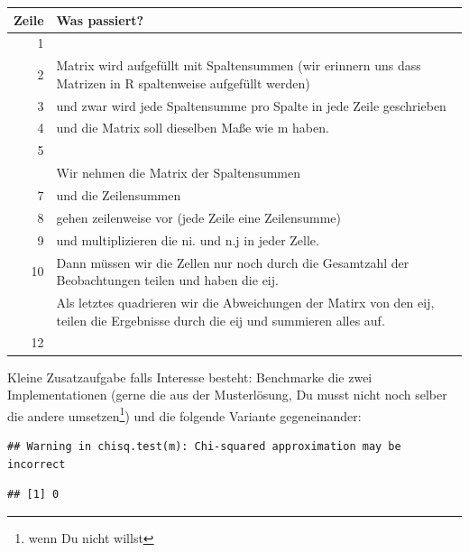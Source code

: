 \documentclass[
]{book}
\newenvironment{Shaded}{\begin{snugshade}}{\end{snugshade}}
\newcommand{\FunctionTok}[1]{\textcolor[rgb]{0.00,0.00,0.00}{#1}}
\newcommand{\NormalTok}[1]{#1}
\newcommand{\SpecialCharTok}[1]{\textcolor[rgb]{0.00,0.00,0.00}{#1}}
\begin{document}
\begin{table}
\centering
\begin{tabular}[t]{rl}
\toprule
Zeile & Was passiert?\\
\midrule
1 & \\
2 & Matrix wird aufgefüllt mit Spaltensummen (wir erinnern uns dass Matrizen in R spaltenweise aufgefüllt werden)\\
3 & und zwar wird jede Spaltensumme pro Spalte in jede Zeile geschrieben\\
4 & und die Matrix soll dieselben Maße wie m haben.\\
5 & \\
\addlinespace
6 & Wir nehmen die Matrix der Spaltensummen\\
7 & und die Zeilensummen\\
8 & gehen zeilenweise vor (jede Zeile eine Zeilensumme)\\
9 & und multiplizieren die ni. und n.j in jeder Zelle.\\
10 & Dann müssen wir die Zellen nur noch durch die Gesamtzahl der Beobachtungen teilen und haben die eij.\\
\addlinespace
11 & Als letztes quadrieren wir die Abweichungen der Matirx von den eij, teilen die Ergebnisse durch die eij und summieren alles auf.\\
12 & \\
\bottomrule
\end{tabular}
\end{table}

Kleine Zusatzaufgabe falls Interesse besteht:
Benchmarke die zwei Implementationen (gerne die aus der Musterlösung, Du musst nicht noch selber die andere umsetzen\footnote{wenn Du nicht willst}) und die folgende Variante gegeneinander:

\begin{Shaded}
\end{Shaded}

\begin{verbatim}
## Warning in chisq.test(m): Chi-squared approximation may be incorrect
\end{verbatim}

\begin{verbatim}
## [1] 0
\end{verbatim}
\end{document}
